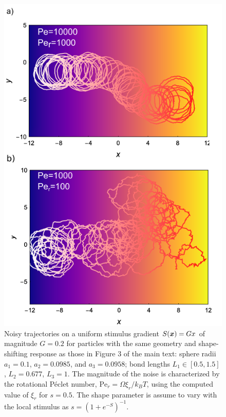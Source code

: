 \begin{appendices}
\begin{figure}[h]
    \centering
    \includegraphics{figures/A3_FigureS5.pdf}
    \caption{Noisy trajectories on a uniform stimulus gradient $S(\boldsymbol{x})=Gx$ of magnitude $G=0.2$ for particles with the same geometry and shape-shifting response as those in Figure 3 of the main text: sphere radii $a_1=0.1$, $a_2=0.0985$, and $a_3=0.0958$; bond lengths $L_1\in[0.5,1.5]$, $L_2=0.677$, $L_3=1$. The magnitude of the noise is characterized by the rotational P\'eclet number, $\text{Pe}_r = \Omega \xi_r/k_B T$, using the computed value of $\xi_r$ for $s=0.5$.  The shape parameter is assume to vary with the local stimulus as $s = (1+ e^{-S})^{-1}$.}
    \label{fig:noise}
\end{figure}


                     
                  




\end{appendices}